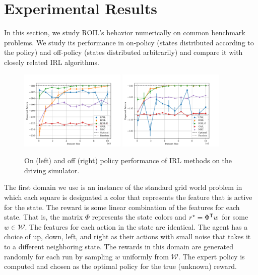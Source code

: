 \documentclass[10pt]{article}
\theoremstyle{plain}
\theoremstyle{remark}
\begin{document}
\section{Experimental Results}
\label{sec:experimental-results}


In this section, we study ROIL's behavior numerically on common benchmark problems. We study its performance in on-policy (states distributed according to the policy) and off-policy (states distributed arbitrarily) and compare it with closely related IRL algorithms.

\begin{figure}
	\centering
	\includegraphics[width=0.45\textwidth]{../src/plots/returns/20x20_gridworld_on_policy_returns.pdf}
	\includegraphics[width=0.45\textwidth]{../src/plots/returns/20x20_gridworld_off_policy_returns.pdf}
	\caption{On (left) and off (right) policy performance of IRL methods on the driving simulator.}
	\label{fig:driving}
\end{figure}

The first domain we use is an instance of the standard grid world problem in which each square is designated a color that represents the feature that is active for the state. The reward is some linear combination of the features for each state. That is, the matrix $\Phi$ represents the state colors and  $r^{\mathnormal{\star}}  = \Phi^{\mathsf{T}} w$ for some $w \in \mathcal{W}$. The features for each action in the state are identical. The agent has a choice of up, down, left, and right as their actions with small noise that takes it to a different neighboring state. The rewards in this domain are generated randomly for each run by sampling $w$ uniformly from $\mathcal{W}$. The expert policy is computed and chosen as the optimal policy for the true (unknown) reward.
\end{document}
